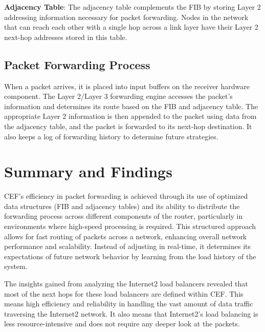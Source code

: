 \documentclass[12pt]{cwru_thesis}
\begin{document}
\textbf{Adjacency Table}: The adjacency table complements the FIB by storing Layer 2 addressing information necessary for packet forwarding. Nodes in the network that can reach each other with a single hop across a link layer have their Layer 2 next-hop addresses stored in this table. 






\subsection{Packet Forwarding Process}

 When a packet arrives, it is placed into input buffers on the receiver hardware component. The Layer 2/Layer 3 forwarding engine accesses the packet's information and determines its route based on the FIB and adjacency table. The appropriate Layer 2 information is then appended to the packet using data from the adjacency table, and the packet is forwarded to its next-hop destination. It also keeps a log of forwarding history to determine future strategies. 




\section{Summary and Findings}


CEF's efficiency in packet forwarding is achieved through its use of optimized data structures (FIB and adjacency tables) and its ability to distribute the forwarding process across different components of the router, particularly in environments where high-speed processing is required. This structured approach allows for fast routing of packets across a network, enhancing overall network performance and scalability. Instead of adjusting in real-time, it determines its expectations of future network behavior by learning from the load history of the system.

The insights gained from analyzing the Internet2 load balancers revealed that most of the next hops for these load balancers are defined within CEF. This means high efficiency and reliability in handling the vast amount of data traffic traversing the Internet2 network. It also means that Internet2's load balancing is less resource-intensive and does not require any deeper look at the packets.
\end{document}
